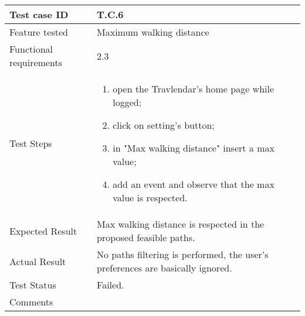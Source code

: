\begin{table}[H]
	\begin{center}
		\begin{tabular}{ | p{} | p{} | }
		\hline
		Test case ID & T.C.6\\
		\hline
		Feature tested & Maximum walking
distance\\
		\hline
		Functional requirements & 2.3  \\
		\hline
		Test Steps & 
			\begin{enumerate}
				\item open the Travlendar's home page while logged;
				\item click on setting's button;
				\item in "Max walking distance" insert a max value;
				\item add an event and observe that the max value is respected.
			\end{enumerate} \\
		\hline
		Expected Result & Max walking distance is respected in the proposed feasible paths.\\
		\hline
		Actual Result & No paths filtering is performed, the user's preferences are basically ignored.\\ 
		\hline
		Test Status & \color{Red}Failed.\\ 
		\hline
		Comments &\\ 
		\hline
		\end{tabular}
	\end{center}
\end{table}

